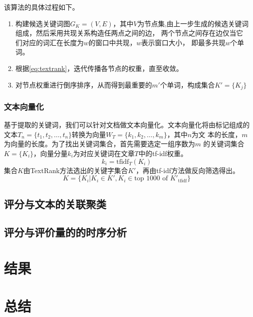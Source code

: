 该算法的具体过程如下。
\begin{enumerate}
    \item 构建候选关键词图$G_K = (V,E)$，其中$V$为节点集,由上一步生成的候选关键词组成，然后采用共现关系构造任两点之间的边，
    两个节点之间存在边仅当它们对应的词汇在长度为$w$的窗口中共现，$w$表示窗口大小，
    即最多共现$w$个单词。
    \item 根据\autoref{eq:textrank}，迭代传播各节点的权重，直至收敛。
    \item 对节点权重进行倒序排序，从而得到最重要的$m'$个单词，构成集合$K'=\{K_j\}$
\end{enumerate}






\subsection{文本向量化}

基于提取的关键词，我们可以针对文档做文本向量化。文本向量化将由标记组成的
文本$T_n=\{t_1,t_2,\ldots,t_n\}$转换为向量$W_T=\{k_1,k_2,\ldots,k_m\}$，其中$n$为文
本的长度，$m$为向量的长度。为了找出关键词集合，首先需要选定一组序数为$m$
的关键词集合$K=\{K_i\}$，向量分量$k_i$为对应关键词在文章$T$中的tf-idf权重。
\begin{equation}
    k_i = \textrm{tfidf}_T(K_i)
\end{equation}
集合$K$由TextRank方法选出的关键字集合$K'$，再由tf-idf方法做反向筛选得出。
\begin{equation}
    K = \{K_i | K_i \in K', K_i \in \textrm{top 1000 of }K'_{\textrm{tfidf}} \}
\end{equation}

\section{评分与文本的关联聚类}

\section{评分与评价量的的时序分析}

\chapter{结果}

\chapter{总结}

